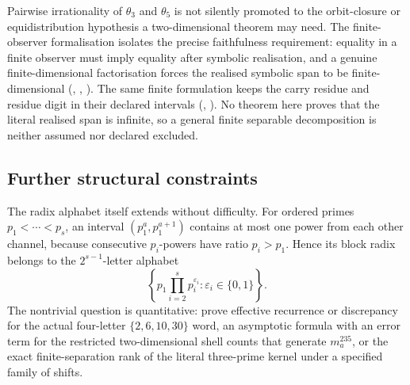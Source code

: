 Pairwise irrationality of $\theta_3$ and $\theta_5$ is not silently promoted
to the orbit-closure or equidistribution hypothesis a two-dimensional theorem
may need.  The finite-observer formalisation isolates the precise
faithfulness requirement: equality in a finite observer must imply equality
after symbolic realisation, and a genuine finite-dimensional factorisation
forces the realised symbolic span to be finite-dimensional
(,
,
).
The same finite formulation keeps the carry residue and residue digit in their
declared intervals
(,
).
No theorem here proves that the literal realised span is infinite, so a
general finite separable decomposition is neither assumed nor declared
excluded.

\subsection{Further structural constraints}

The radix alphabet itself extends without difficulty.  For ordered primes
$p_1<\cdots<p_s$, an interval $(p_1^a,p_1^{a+1})$ contains at most one power
from each other channel, because consecutive $p_i$-powers have ratio
$p_i>p_1$.  Hence its block radix belongs to the $2^{s-1}$-letter alphabet
\[
 \left\{p_1\prod_{i=2}^s p_i^{\varepsilon_i}:
   \varepsilon_i\in\{0,1\}\right\}.
\]
The nontrivial question is quantitative: prove effective recurrence or
discrepancy for the actual four-letter $\{2,6,10,30\}$ word, an asymptotic
formula with an error term for the restricted two-dimensional shell counts
that generate $m_a^{235}$, or the exact finite-separation rank of the literal
three-prime kernel under a specified family of shifts.

